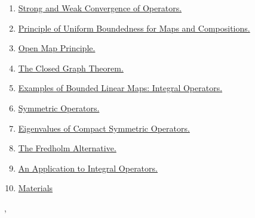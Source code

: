 \documentclass[11pt]{article}
\renewcommand{\today}{\shortmonthname[\the\month] \the \day,  \the\year}
\begin{document}
\begin{enumerate}
	\item  \href{https://mp.weixin.qq.com/s/yUu3Fl2UZ1RNgCg0HWHTsw}{Strong and Weak Convergence of Operators.} %
	\item  \href{https://mp.weixin.qq.com/s/6azd_l8QIOJ54mmO41HI3w}{Principle of Uniform Boundedness for Maps and Compositions.} %
	\item  \href{https://mp.weixin.qq.com/s/ETet6wS-udN_0PCyq9L4wg}{Open Map Principle.} %
	\item  \href{https://mp.weixin.qq.com/s/2eWeNU41MiO9TeBi-iujeg}{The Closed Graph Theorem.} %
	\item  \href{https://mp.weixin.qq.com/s/Ex3vqAsfDePlvf-MNXpTeQ}{Examples of Bounded Linear Maps: Integral Operators.} %
	\item  \href{https://mp.weixin.qq.com/s/y4QnNRMBuSvpjsUrgvQXBg}{Symmetric Operators.} %
	\item  \href{https://mp.weixin.qq.com/s/3KafTQA_-lHNFpqBAqbtpg}{Eigenvalues of Compact Symmetric Operators.} %
	\item  \href{https://mp.weixin.qq.com/s/zWsrqCXvefTB2LR3J6fXjg}{The Fredholm Alternative.} %
	\item  \href{https://mp.weixin.qq.com/s/Jxu8WofU5jjbppWJwGW19g}{An Application to Integral Operators.} %
	\item \href{https://pan.baidu.com/s/1MrqEmxLAqhar2GiFoDc91g?pwd=1121}{Materials}
\end{enumerate}

%
\begin{flushright}
	\tiny \today 
\end{flushright}
\end{document}
